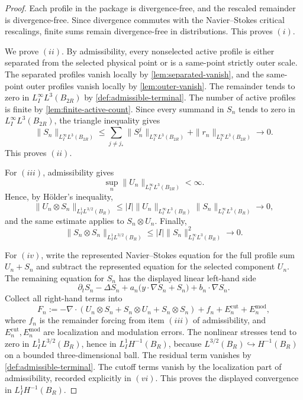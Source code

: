 \documentclass[11pt]{amsart}
\theoremstyle{plain}
\theoremstyle{definition}
\theoremstyle{remark}
\begin{document}
\begin{proof}
Each profile in the package is divergence-free, and the rescaled remainder is
divergence-free.  Since divergence commutes with the Navier--Stokes critical
rescalings, finite sums remain divergence-free in distributions.  This proves
\((i)\).

We prove \((ii)\).  By admissibility, every nonselected active profile is either
separated from the selected physical point or is a same-point strictly outer
scale.  The separated profiles vanish locally by \cref{lem:separated-vanish},
and the same-point outer profiles vanish locally by \cref{lem:outer-vanish}.
The remainder tends to zero in \(L^\infty_I L^3(B_{2R})\) by
\cref{def:admissible-terminal}.  The number of active profiles is finite by
\cref{lem:finite-active-count}.  Since every summand in \(S_n\)
tends to zero in \(L^\infty_I L^3(B_{2R})\), the triangle inequality gives
\[
  \|S_n\|_{L^\infty_I L^3(B_{2R})}
  \le
  \sum_{j\ne j_*}\|S^j_n\|_{L^\infty_I L^3(B_{2R})}
  +\|r_n\|_{L^\infty_I L^3(B_{2R})}\to0.
\]
This proves \((ii)\).

For \((iii)\), admissibility gives
\[
  \sup_n\|U_n\|_{L^\infty_I L^3(B_{2R})}<\infty.
\]
Hence, by H\"older's inequality,
\[
  \|U_n\otimes S_n\|_{L^1_IL^{3/2}(B_R)}
  \le |I|\|U_n\|_{L^\infty_IL^3(B_R)}
       \|S_n\|_{L^\infty_IL^3(B_R)}\to0,
\]
and the same estimate applies to \(S_n\otimes U_n\).  Finally,
\[
  \|S_n\otimes S_n\|_{L^1_IL^{3/2}(B_R)}
  \le |I|\|S_n\|_{L^\infty_IL^3(B_R)}^2\to0.
\]

For \((iv)\), write the represented Navier--Stokes equation for the full
profile sum \(U_n+S_n\) and subtract the represented equation for the selected
component \(U_n\).  The remaining equation for \(S_n\) has the displayed linear
left-hand side
\[
  \partial_t S_n-\Delta S_n
  +a_n\bigl(y\cdot\nabla S_n+S_n\bigr)+b_n\cdot\nabla S_n.
\]
Collect all right-hand terms into
\[
  F_n:= -\nabla\cdot(U_n\otimes S_n+S_n\otimes U_n+S_n\otimes S_n)
       +f_n+E_n^{\mathrm{cut}}+E_n^{\mathrm{mod}},
\]
where \(f_n\) is the remainder forcing from item \((iii)\) of admissibility, and
\(E_n^{\mathrm{cut}},E_n^{\mathrm{mod}}\) are localization and modulation errors.
The nonlinear stresses tend to zero in \(L^1_IL^{3/2}(B_R)\), hence in
\(L^1_IH^{-1}(B_R)\), because \(L^{3/2}(B_R)\hookrightarrow H^{-1}(B_R)\) on a
bounded three-dimensional ball.  The residual term vanishes by
\cref{def:admissible-terminal}.  The cutoff terms vanish by the localization
part of admissibility, recorded explicitly in \((vi)\).  This proves the
displayed convergence in \(L^1_IH^{-1}(B_R)\).


\end{proof}
\end{document}
